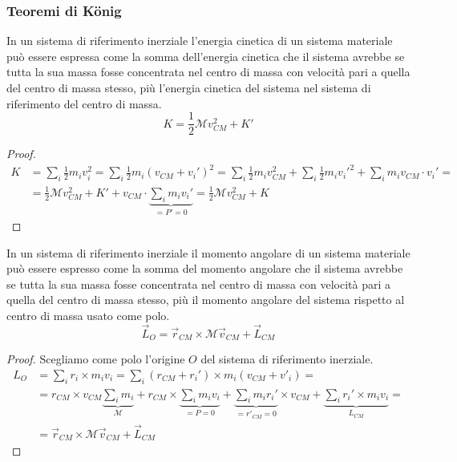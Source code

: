 \documentclass{article}
\theoremstyle{plain}
\begin{document}
\subsubsection{Teoremi di König}
\begin{shadedTheorem}
    In un sistema di riferimento inerziale l'energia cinetica di un sistema materiale può essere espressa come la somma dell'energia cinetica che il sistema avrebbe se tutta la sua massa fosse concentrata nel centro di massa con velocità pari a quella del centro di massa stesso, più l'energia cinetica del sistema nel sistema di riferimento del centro di massa.
    \[K =\frac{1}{2}\mathcal M v_{CM}^2 + K'\]
\end{shadedTheorem}
\begin{proof}
    \[\begin{aligned}K &=\sum_i \frac{1}{2}m_iv_i^2 = \sum_i \frac{1}{2}m_i(v_{CM} + v_i')^2 = \sum_i \frac{1}{2}m_iv_{CM}^2 +\sum_i \frac{1}{2}m_iv_i'^2 + \sum_im_iv_{CM}\cdot v_i' = \\&= \frac{1}{2}\mathcal M v_{CM}^2 + K' + v_{CM}\cdot \underbrace{\sum_im_iv_i'}_{ =P' = 0}
    = \boxed{\frac{1}{2}\mathcal M v_{CM}^2 + K} \end{aligned}\]
\end{proof}
\begin{shadedTheorem}
    In un sistema di riferimento inerziale il momento angolare di un sistema materiale può essere espresso come la somma del momento angolare che il sistema avrebbe se tutta la sua massa fosse concentrata nel centro di massa con velocità pari a quella del centro di massa stesso, più il momento angolare del sistema rispetto al centro di massa usato come polo.
    \[\vec L_O = \vec r_{CM} \times \mathcal M \vec v_{CM} + \vec L_{CM}\]
\end{shadedTheorem}
\begin{proof}
    Scegliamo come polo l'origine $O$ del sistema di riferimento inerziale.
    \[\begin{aligned}
        L_O &= \sum_i r_i \times m_iv_i = \sum_i (r_{CM} + r_i') \times m_i(v_{CM} + v'_i) = \\&=
        r_{CM} \times v_{CM}\underbrace{\sum_i m_i}_{\mathcal M} +
        r_{CM} \times \underbrace{\sum_i m_iv_i}_{ = P = 0} +
        \underbrace{\sum_i m_i r_i' }_{ =r'_{CM} = 0}\times v_{CM} +
        \underbrace{\sum_i r_i' \times m_iv_i}_{L_{CM}} =\\&= \boxed{\vec r_{CM} \times \mathcal M \vec v_{CM} + \vec L_{CM}}
    \end{aligned}\]
\end{proof}
\end{document}
